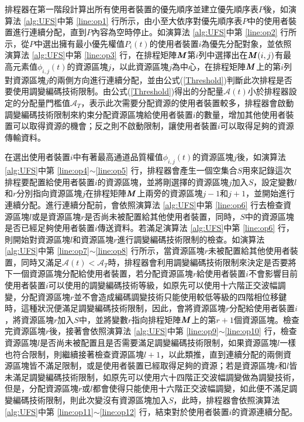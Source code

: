 排程器在第一階段計算出所有使用者裝置的優先順序並建立優先順序表$P$後，如演算法 \ref{alg:UFS}中第 \ref{line:op1} 行所示，由小至大依序對優先順序表$P$中的使用者裝置進行連續分配，直到$P$內容為空時停止。如演算法 \ref{alg:UFS}中第 \ref{line:op2} 行所示，從$P$中選出擁有最小優先權值$P_i(t)$的使用者裝置$i$為優先分配對象，並依照演算法 \ref{alg:UFS}中第 \ref{line:op3} 行，在排程矩陣$\textbf{\textit{M}}$第$i$列中選擇出在$\textbf{\textit{M}}(i,j)$有最高元素值$\phi_{i,j}(t)$的資源區塊$j$，以此資源區塊$j$為中心，在排程矩陣$\textbf{\textit{M}}$上的第$i$列對資源區塊$j$的兩側方向進行連續分配，並由公式(\ref{Threshold})判斷此次排程是否要使用調變編碼技術限制。由公式(\ref{Threshold})得出的分配量$\mathcal{A}(t)$小於排程器設定的分配量門檻值$\mathcal{A}_T$，表示此次需要分配資源的使用者裝置較多，排程器會啟動調變編碼技術限制來約束分配資源區塊給使用者裝置$i$的數量，增加其他使用者裝置可以取得資源的機會；反之則不啟動限制，讓使用者裝置$i$可以取得足夠的資源傳輸資料。

在選出使用者裝置$i$中有著最高通道品質權值$\phi_{i,j}(t)$的資源區塊$j$後，如演算法 \ref{alg:UFS}中第 \ref{line:op4}$\sim$\ref{line:op5} 行，排程器會產生一個空集合$S$用來記錄這次排程要配置給使用者裝置$i$的資源區塊，並將剛選擇的資源區塊$j$加入$S$，設定變數$l$和$r$分別指向資源區塊$j$在排程矩陣$\textbf{\textit{M}}$上兩旁的資源區塊$j-1$和$j+1$，並開始進行連續分配。進行連續分配前，會依照演算法 \ref{alg:UFS}中第 \ref{line:op6} 行去檢查資源區塊$l$或是資源區塊$r$是否尚未被配置給其他使用者裝置，同時，$S$中的資源區塊是否已經足夠使用者裝置$i$傳送資料。若滿足演算法 \ref{alg:UFS}中第 \ref{line:op6} 行，則開始對資源區塊$l$和資源區塊$r$進行調變編碼技術限制的檢查。如演算法 \ref{alg:UFS}中第 \ref{line:op7}$\sim$\ref{line:op8} 行所示，當資源區塊$r$未被配置給其他使用者裝置，同時又滿足$\mathcal{A}(t)<\mathcal{A}_T$時，排程器會利用調變編碼技術限制來決定是否要將下一個資源區塊分配給使用者裝置，若分配資源區塊$r$給使用者裝置$i$不會影響目前使用者裝置$i$可以使用的調變編碼技術等級，如原先可以使用十六階正交波幅調變，分配資源區塊$r$並不會造成編碼調變技術只能使用較低等級的四階相位移鍵時，這種狀況便滿足調變編碼技術限制，因此，會將資源區塊$r$分配給使用者裝置$i$，將資源區塊$r$加入$S$中，並將變數$r$指向排程矩陣$\textbf{\textit{M}}$上的第$r+1$個資源區塊。檢查完資源區塊$r$後，接著會依照演算法 \ref{alg:UFS}中第 \ref{line:op9}$\sim$\ref{line:op10} 行，檢查資源區塊$l$是否尚未被配置且是否需要滿足調變編碼技術限制，如果資源區塊$l$一樣也符合限制，則繼續接著檢查資源區塊$l+1$，以此類推，直到連續分配的兩側資源區塊皆不滿足限制，或是使用者裝置已經取得足夠的資源；若是資源區塊$r$和$l$皆未滿足調變編碼技術限制，如原先可以使用六十四階正交波幅調變做為調變技術，但是，分配資源區塊$r$或$l$都會使得只能使用十六階正交波幅調變，如此便不滿足調變編碼技術限制，則此次變沒有資源區塊加入$S$，此時，排程器會依照演算法 \ref{alg:UFS}中第 \ref{line:op11}$\sim$\ref{line:op12} 行，結束對於使用者裝置$i$的資源連續分配。

